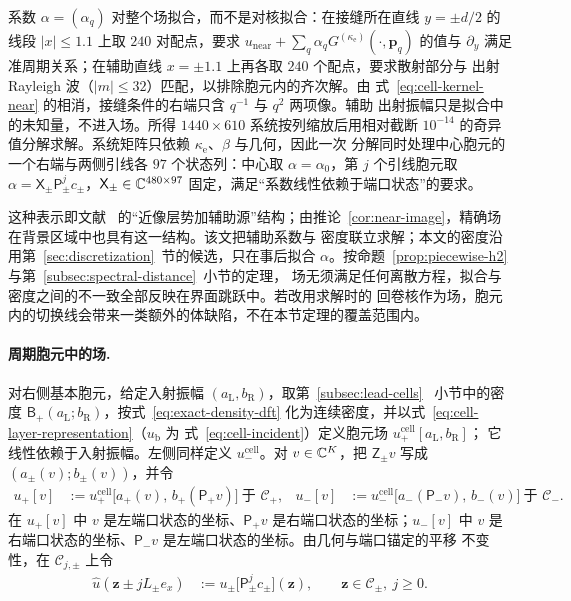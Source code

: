 系数 $\alpha=(\alpha_q)$ 对整个场拟合，而不是对核拟合：在接缝所在直线 $y=\pm d/2$ 的
线段 $|x|\leq1.1$ 上取 $240$ 对配点，要求
$u_{\mathrm{near}}+\sum_q\alpha_qG^{(\kappa_{\mathrm e})}(\cdot,\mathbf p_q)$ 的值与
$\partial_y$ 满足准周期关系；在辅助直线 $x=\pm1.1$ 上再各取 $240$ 个配点，要求散射部分与
出射 Rayleigh 波（$|m|\leq32$）匹配，以排除胞元内的齐次解。由
式~\eqref{eq:cell-kernel-near} 的相消，接缝条件的右端只含 $q^{-1}$ 与 $q^2$ 两项像。辅助
出射振幅只是拟合中的未知量，不进入场。所得 $1440\times610$ 系统按列缩放后用相对截断
$10^{-14}$ 的奇异值分解求解。系统矩阵只依赖 $\kappa_{\mathrm e}$、$\beta$ 与几何，因此一次
分解同时处理中心胞元的一个右端与两侧引线各 $97$ 个状态列：中心取 $\alpha=\alpha_0$，第
$j$ 个引线胞元取 $\alpha=\mathsf X_\pm\mathsf P_\pm^jc_\pm$，$\mathsf X_\pm\in\mathbb{C}^{480\times97}$
固定，满足“系数线性依赖于端口状态”的要求。

这种表示即文献~\cite{BarnettGreengard2010} 的“近像层势加辅助源”结构；由推论~\ref{cor:near-image}，精确场在背景区域中也具有这一结构。该文把辅助系数与
密度联立求解；本文的密度沿用第~\ref{sec:discretization}~节的候选，只在事后拟合
$\alpha$。按命题~\ref{prop:piecewise-h2} 与第~\ref{subsec:spectral-distance}~小节的定理，
场无须满足任何离散方程，拟合与密度之间的不一致全部反映在界面跳跃中。若改用求解时的
回卷核作为场，胞元内的切换线会带来一类额外的体缺陷，不在本节定理的覆盖范围内。

\paragraph{周期胞元中的场.}
对右侧基本胞元，给定入射振幅 $(a_{\mathrm L},b_{\mathrm R})$，取第~\ref{subsec:lead-cells}~
小节中的密度 $\mathsf B_+(a_{\mathrm L};b_{\mathrm R})$，按式~\eqref{eq:exact-density-dft}
化为连续密度，并以式~\eqref{eq:cell-layer-representation}（$u_{\mathrm b}$ 为
式~\eqref{eq:cell-incident}）定义胞元场 $u_+^{\mathrm{cell}}[a_{\mathrm L},b_{\mathrm R}]$；
它线性依赖于入射振幅。左侧同样定义 $u_-^{\mathrm{cell}}$。对 $v\in\mathbb{C}^K$，把
$\mathsf Z_\pm v$ 写成 $(a_\pm(v);b_\pm(v))$，并令
\begin{align}
  u_+[v]&:=u_+^{\mathrm{cell}}\bigl[a_+(v),\,b_+(\mathsf P_+v)\bigr]\ \text{于 }\mathcal C_+,
  &u_-[v]&:=u_-^{\mathrm{cell}}\bigl[a_-(\mathsf P_-v),\,b_-(v)\bigr]\ \text{于 }\mathcal C_-.
  \label{eq:lead-cell-field}
\end{align}
在 $u_+[v]$ 中 $v$ 是左端口状态的坐标、$\mathsf P_+v$ 是右端口状态的坐标；$u_-[v]$ 中
$v$ 是右端口状态的坐标、$\mathsf P_-v$ 是左端口状态的坐标。由几何与端口锚定的平移
不变性，在 $\mathcal C_{j,\pm}$ 上令
\begin{align}
  \widehat u(\mathbf z\pm jL_\pm e_x)
  &:=u_\pm\bigl[\mathsf P_\pm^jc_\pm\bigr](\mathbf z),
  \qquad\mathbf z\in\mathcal C_\pm,\ j\geq0.
  \label{eq:half-guide-raw-field}
\end{align}

